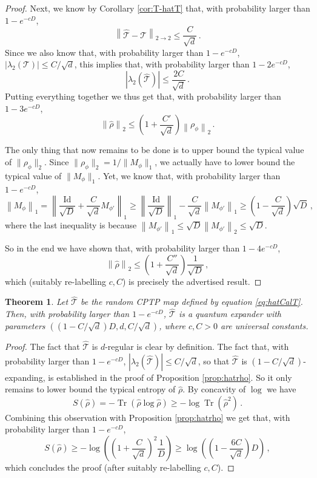 \documentclass{amsart}
\newtheorem{theorem}{Theorem}[section]
\renewcommand{\leq}{\leqslant}
\renewcommand{\geq}{\geqslant}
\newcommand{\Id}{\mathrm{Id}}
\DeclareMathOperator{\Tr}{Tr}
\begin{document}
\begin{proof}
    Next, we know by Corollary \ref{cor:T-hatT} that, with probability larger than $1-e^{-cD}$,
    \[ \left\|\hat{\mathcal{T}}-\mathcal{T}\right\|_{2\rightarrow 2} \leq \frac{C}{\sqrt{d}} \, . \]
    Since we also know that, with probability larger than $1-e^{-cD}$, $|\lambda_2(\mathcal{T})|\leq C/\sqrt{d}$, this implies that, with probability larger than $1-2e^{-cD}$,
    \[ |\lambda_2(\hat{\mathcal{T}})| \leq \frac{2C}{\sqrt{d}} \, . \]
    Putting everything together we thus get that, with probability larger than $1-3e^{-cD}$,
    \[ \left\|\hat{\rho}\right\|_{2} \leq \left( 1 + \frac{C'}{\sqrt{d}} \right) \left\|\rho_{\phi}\right\|_2 \, . \]

    The only thing that now remains to be done is to upper bound the typical value of $\|\rho_{\phi}\|_2$. Since $\|\rho_{\phi}\|_2=1/\|M_{\phi}\|_1$, we actually have to lower bound the typical value of $\|M_{\phi}\|_1$. Yet, we know that, with probability larger than $1-e^{-cD}$,
    \[ \left\|M_{\phi}\right\|_1 = \left\| \frac{\Id}{\sqrt{D}} + \frac{C}{\sqrt{d}} M_{\phi'} \right\|_1 \geq \left\| \frac{\Id}{\sqrt{D}} \right\|_1 - \frac{C}{\sqrt{d}} \left\| M_{\phi'} \right\|_1 \geq \left(1-\frac{C}{\sqrt{d}}\right)\sqrt{D} \, , \]
    where the last inequality is because $\left\| M_{\phi'} \right\|_1\leq\sqrt{D}\left\| M_{\phi'} \right\|_2\leq \sqrt{D}$.

    So in the end we have shown that, with probability larger than $1-4e^{-cD}$,
    \[ \left\|\hat{\rho}\right\|_{2} \leq \left( 1 + \frac{C''}{\sqrt{d}} \right) \frac{1}{\sqrt{D}} \, , \]
    which (suitably re-labelling $c,C$) is precisely the advertised result.
\end{proof}

\begin{theorem}
    Let $\hat{\mathcal{T}}$ be the random CPTP map defined by equation \eqref{eq:hatCalT}. Then, with probability larger than $1-e^{-cD}$, $\hat{\mathcal{T}}$ is a quantum expander with parameters $((1-C/\sqrt{d})D,d,C/\sqrt{d})$, where $c,C>0$ are universal constants.
\end{theorem}

\begin{proof}
    The fact that $\hat{\mathcal{T}}$ is $d$-regular is clear by definition.
    The fact that, with probability larger than $1-e^{-cD}$, $|\lambda_2(\hat{\mathcal{T}})|\leq C/\sqrt{d}$, so that $\hat{\mathcal{T}}$ is $(1-C/\sqrt{d})$-expanding, is established in the proof of Proposition \ref{prop:hatrho}. So it only remains to lower bound the typical entropy of $\hat{\rho}$. By concavity of $\log$ we have
    \[ S(\hat{\rho}) = -\Tr(\hat{\rho}\log\hat{\rho}) \geq -\log\Tr(\hat{\rho}^2) \, .\]
    Combining this observation with Proposition \ref{prop:hatrho} we get that, with probability larger than $1-e^{-cD}$,
    \[ S(\hat{\rho}) \geq -\log\left(\left( 1 + \frac{C}{\sqrt{d}} \right)^2 \frac{1}{D} \right) \geq \log \left(\left( 1 - \frac{6C}{\sqrt{d}} \right) D \right) \, , \]
    which concludes the proof (after suitably re-labelling $c,C$).
\end{proof}
\end{document}
